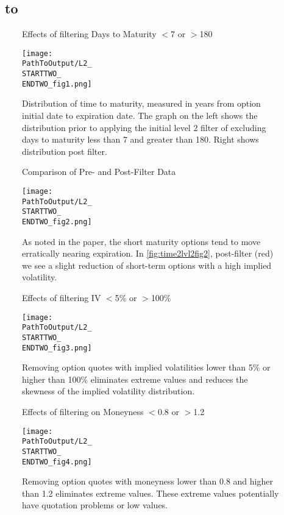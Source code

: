 \begin{appendix}
\subsection{\STARTTWO\ to \ENDTWO }

\begin{figure}[H] %
  \centering
  \caption{Effects of filtering Days to Maturity $<$7 or $>$180}
  \texttt{[image: \\PathToOutput/L2\_\\STARTTWO\_\\ENDTWO\_fig1.png]}
  \caption*{Distribution of time to maturity, measured in years from option initial date to expiration date. The graph on the left shows the distribution prior to applying the initial level 2 filter of excluding days to maturity less than 7 and greater than 180. Right shows distribution post filter.}
\label{fig:time2lvl2fig1}
\end{figure}

\begin{figure}[H] %
  \centering
  \caption{Comparison of Pre- and Post-Filter Data}
  \texttt{[image: \\PathToOutput/L2\_\\STARTTWO\_\\ENDTWO\_fig2.png]}
  \caption*{As noted in the paper, the short maturity options tend to move erratically nearing expiration. In \autoref{fig:time2lvl2fig2}, post-filter (red) we see a slight reduction of short-term options with a high implied volatility.}
  \label{fig:time2lvl2fig2}
\end{figure}


\begin{figure}[H] %
  \centering
  \caption{Effects of filtering IV $<$5\% or $>$100\%}
  \texttt{[image: \\PathToOutput/L2\_\\STARTTWO\_\\ENDTWO\_fig3.png]}
  \caption*{Removing option quotes with implied volatilities lower than 5\% or higher than 100\% eliminates extreme values and reduces the skewness of the implied volatility distribution.}
\label{fig:time2lvl2fig3}
\end{figure}


\begin{figure}[H] %
  \centering
  \caption{Effects of filtering on Moneyness $<$0.8 or $>$1.2}
  \texttt{[image: \\PathToOutput/L2\_\\STARTTWO\_\\ENDTWO\_fig4.png]}
  \caption*{Removing option quotes with moneyness lower than 0.8 and higher than 1.2 eliminates extreme values. These extreme values potentially have quotation problems or low values.}
  \label{fig:time2lvl2fig4}
\end{figure}




\end{appendix}
